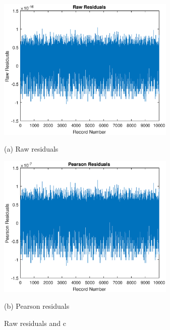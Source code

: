 \documentclass[runningheads,a4paper]{llncs}
\begin{document}
  \begin{figure}[bth]
    \begin{minipage}{0.28\linewidth}
      \centerline{\includegraphics[width=8.5cm]{Residuals_Raw.eps}}
      \centerline{(a) Raw residuals}
    \end{minipage}
    \hfill
    \begin{minipage}{.28\linewidth}
      \centerline{\includegraphics[width=8.5cm]{Residuals_Pearson.eps}}
      \centerline{(b) Pearson residuals}
    \end{minipage}
    \caption{Raw residuals and c}
    \label{fig:RawPearsonResiduals}
  \end{figure}
\end{document}
